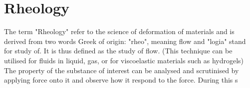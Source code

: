\section{Rheology}
The term "Rheology" refer to the science of deformation of materials and is derived from two words Greek of origin: "rheo", meaning flow and "logia" stand for study of. It is thus defined as the study of flow.
(This technique can be utilised for fluids in liquid, gas, or for viscoelastic materials such as hydrogels)\\
The property of the substance of interest can be analysed and scrutinised by applying force onto it and observe how it respond to the force. During this s 



\parencite{Cossa2019}